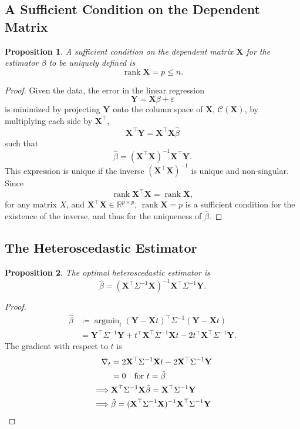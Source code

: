 \documentclass[letterpaper, reqno]{amsart}
\newtheorem{prop}{Proposition}[section]
\numberwithin{equation}{section}
\newcommand{\T}{\top} %
\newcommand{\vect}[1]{\boldsymbol{\mathbf{#1}}} %
\newcommand{\R}{\mathbb{R}}  %
\newcommand{\Xm}{\vect{X}}
\newcommand{\Yv}{\vect{Y}}
\newcommand{\Bv}{\beta}
\newcommand{\Bvh}{\hat{\beta}}
\newcommand{\ve}{\varepsilon}
\DeclareMathOperator*{\argmin}{argmin}
\DeclareMathOperator{\rank}{rank}
\begin{document}
\subsection{A Sufficient Condition on the Dependent Matrix}
\begin{prop}
  A sufficient condition on the dependent matrix $\Xm$ for the estimator $\Bv$ to
  be uniquely defined is
  \[ \rank \Xm = p \le n. \]
\end{prop}

\begin{proof}
  Given the data, the error in the linear regression
  \[ \Yv = \Xm\Bv + \ve \]
  is minimized by projecting $\Yv$ onto the column space of $\Xm$,
  $\mathscr{C}(\Xm)$, by multiplying each side by $\Xm^\T$,
  \[ \Xm^\T\Yv = \Xm^\T\Xm\Bvh \]
  such that
  \[ \Bvh = (\Xm^\T\Xm)^{-1} \Xm^\T \Yv. \]
  This expression is unique if the inverse $(\Xm^\T\Xm)^{-1}$ is unique and non-singular.
  Since
  \[ \rank \Xm^\T\Xm = \rank \Xm, \]
  for any matrix $X$, and $\Xm^\T \Xm \in \R^{p \times p}$, $\rank \Xm = p$ is
  a sufficient condition for the existence of the inverse, and thus for the
  uniqueness of $\Bvh$.
\end{proof}

\subsection{The Heteroscedastic Estimator}
\begin{prop}
  The optimal heteroscedastic estimator is
  \[ \Bvh = (\Xm^\T \Sigma^{-1} \Xm)^{-1} \Xm^\T \Sigma^{-1} \Yv. \]
\end{prop}

\begin{proof}
  \begin{align*}
    \Bvh &\coloneqq \argmin_t (\Yv - \Xm t)^\T \Sigma^{-1} (\Yv - \Xm t) \\
    &= \Yv^\T \Sigma^{-1} \Yv + t^\T \Xm^\T \Sigma^{-1} \Xm t - 2t^\T
    \Xm^\T \Sigma^{-1} \Yv.
  \end{align*}
  The gradient with respect to $t$ is
  \begin{align*}
    \nabla_t &= 2 \Xm^\T \Sigma^{-1} \Xm t - 2 \Xm^\T \Sigma^{-1} \Yv \\
             &= 0 \quad \text{for } t = \Bvh \\
    \implies& \Xm^\T \Sigma^{-1} \Xm \Bvh = \Xm^\T \Sigma^{-1} \Yv \\
    \implies& \Bvh = (\Xm^\T \Sigma^{-1} \Xm)^{-1} \Xm^\T \Sigma^{-1} \Yv
    \qedhere
  \end{align*}
\end{proof}
\end{document}
